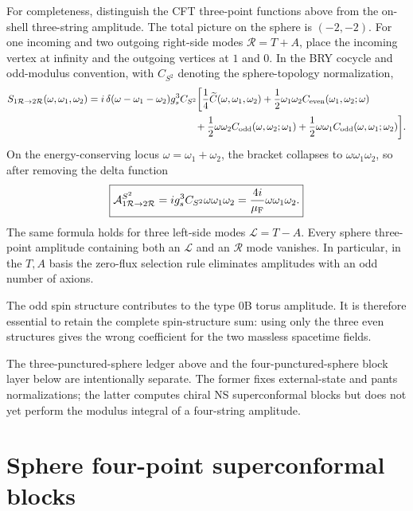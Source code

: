 \documentclass[11pt]{article}
\begin{document}
For completeness, distinguish the CFT three-point functions above from the
on-shell three-string amplitude.  The total picture on the sphere is
$(-2,-2)$.  For one incoming and two outgoing right-side modes
$\mathcal R=T+A$, place the incoming vertex at infinity and the outgoing
vertices at $1$ and $0$.  In the BRY cocycle and odd-modulus convention,
with $C_{S^2}$ denoting the sphere-topology normalization,
\begin{align}
 S_{1\mathcal R\to2\mathcal R}(\omega,\omega_1,\omega_2)
 &=i\,\delta(\omega-\omega_1-\omega_2)g_s^3C_{S^2}
 \bigg[
 \frac14\widetilde C(\omega,\omega_1,\omega_2)
 +\frac12\omega_1\omega_2
 C_{\rm even}(\omega_1,\omega_2;\omega)\notag\\
 &\hspace{3.8cm}
 +\frac12\omega\omega_2
 C_{\rm odd}(\omega,\omega_2;\omega_1)
 +\frac12\omega\omega_1
 C_{\rm odd}(\omega,\omega_1;\omega_2)
 \bigg].
 \label{eq:physical-sphere-three-point}
\end{align}
On the energy-conserving locus $\omega=\omega_1+\omega_2$, the bracket
collapses to $\omega\omega_1\omega_2$, so after removing the delta function
\begin{equation}
 \boxed{
 \mathcal A_{1\mathcal R\to2\mathcal R}^{S^2}
 =i g_s^3C_{S^2}\omega\omega_1\omega_2
 =\frac{4i}{\mu_{\rm F}}\omega\omega_1\omega_2.}
 \label{eq:physical-sphere-three-point-onshell}
\end{equation}
The same formula holds for three left-side modes $\mathcal L=T-A$.
Every sphere three-point amplitude containing both an $\mathcal L$ and an
$\mathcal R$ mode vanishes.  In particular, in the $T,A$ basis the zero-flux
selection rule eliminates amplitudes with an odd number of axions.

The odd spin structure contributes to the type 0B torus amplitude.  It is
therefore essential to retain the complete spin-structure sum: using only the
three even structures gives the wrong coefficient for the two massless
spacetime fields.

The three-punctured-sphere ledger above and the four-punctured-sphere block
layer below are intentionally separate.  The former fixes external-state and
pants normalizations; the latter computes chiral NS superconformal blocks but
does not yet perform the modulus integral of a four-string amplitude.

\section{Sphere four-point superconformal blocks}
\label{sec:sphere-superconformal-blocks}
\end{document}
